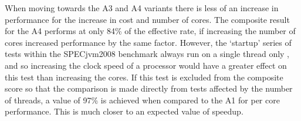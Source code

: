 \documentclass{llncs}
\begin{document}
When moving towards the A3 and A4 variants there is less of an increase in performance for the increase in cost and number of cores. The composite result for the A4 performs at only 84\% of the effective rate, if increasing the number of cores increased performance by the same factor. However, the `startup' series of tests within the SPECjvm2008 benchmark always run on a single thread only \cite{specjvmguide}, and so increasing the clock speed of a processor would have a greater effect on this test than increasing the cores. If this test is excluded from the composite score so that the comparison is made directly from tests affected by the number of threads, a value of 97\% is achieved when compared to the A1 for per core performance. This is much closer to an expected value of speedup.

\end{document}
